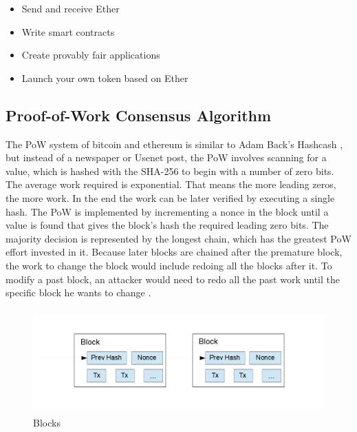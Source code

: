 \begin{itemize}
	\item Send and receive Ether
	\item Write smart contracts
	\item Create provably fair applications
	\item Launch your own token based on Ether
\end{itemize}


\clearpage

\subsection{Proof-of-Work Consensus Algorithm}
\label{subsec:background:first_section:second_subsection}


The \ac{PoW} system of bitcoin and ethereum is similar to Adam Back's Hashcash \cite{back2002hashcash}, but instead of a newspaper or Usenet post, the \ac{PoW} involves scanning for a value, which is hashed with the \ac{SHA-256} to begin with a number of zero bits. The average work required is exponential. That means the more leading zeros, the more work. In the end the work can be later verified by executing a single hash. The \ac{PoW} is implemented by incrementing a nonce in the block until a value is found that gives the block's hash the required leading zero bits. The majority decision is represented by the longest chain, which has the greatest \ac{PoW} effort invested in it. Because later blocks are chained after the premature block, the work to change the block would include redoing all the blocks after it. To modify a past block, an attacker would need to redo all the past work until the specific block he wants to change \cite{nakamoto2008peer}. 

\begin{figure}[h]
	\includegraphics[height=4cm]{blocks}
	\caption{Blocks}
	\label{fig:blocks}
\end{figure}

